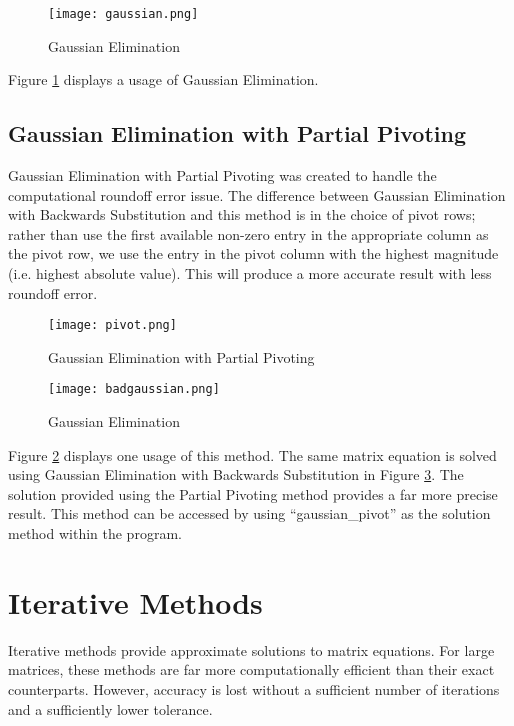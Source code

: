 \documentclass[12pt]{article}
\begin{document}
\begin{figure}[H]
\texttt{[image: gaussian.png]}
\caption{Gaussian Elimination}
\label{gaussian}
\end{figure}

Figure \ref{gaussian} displays a usage of Gaussian Elimination. 


\subsection{Gaussian Elimination with Partial Pivoting}
Gaussian Elimination with Partial Pivoting was created to handle the 
computational roundoff error issue. The difference between Gaussian Elimination
with Backwards Substitution and this method is in the choice of pivot rows; 
rather than use the first available non-zero entry in the appropriate column
 as the pivot row, we use the entry in the pivot column with the highest magnitude (i.e. highest absolute value). 
 This will produce a more accurate result with less roundoff error. 

\begin{figure}[H]
\texttt{[image: pivot.png]}
\caption{Gaussian Elimination with Partial Pivoting}
\label{pivot}
\end{figure}

\begin{figure}[H]
\texttt{[image: badgaussian.png]}
\caption{Gaussian Elimination}
\label{badgaussian}
\end{figure}

Figure \ref{pivot} displays one usage of this method. The same matrix equation is solved
using Gaussian Elimination with Backwards Substitution in Figure \ref{badgaussian}. 
The solution provided using the Partial Pivoting method provides a far more 
precise result. This method can be accessed by using ``gaussian\_pivot'' as the 
solution method within the program.


\section{Iterative Methods}
Iterative methods provide approximate solutions to matrix equations. For large
matrices, these methods are far more computationally efficient than their
exact counterparts. However, accuracy is lost without a sufficient number of 
iterations and a sufficiently lower tolerance. 
\end{document}
